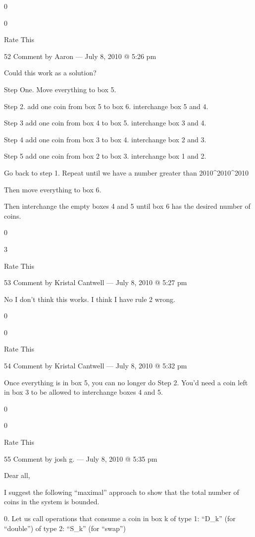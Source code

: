     0
     
    0
     
    Rate This

    52 Comment by Aaron — July 8, 2010 @ 5:26 pm

    Could this work as a solution?

    Step One.
    Move everything to box 5.

    Step 2.
    add one coin from box 5 to box 6.
    interchange box 5 and 4.

    Step 3
    add one coin from box 4 to box 5.
    interchange box 3 and 4.

    Step 4
    add one coin from box 3 to box 4.
    interchange box 2 and 3.

    Step 5
    add one coin from box 2 to box 3.
    interchange box 1 and 2.

    Go back to step 1. Repeat until we have a number greater than 2010^{2010^{2010}}

    Then move everything to box 6.

    Then interchange the empty boxes 4 and 5 until box 6
    has the desired number of coins.
     
    0
     
    3
     
    Rate This

    53 Comment by Kristal Cantwell — July 8, 2010 @ 5:27 pm

        No I don’t think this works. I think I have rule 2 wrong.
         
        0
         
        0
         
        Rate This

        54 Comment by Kristal Cantwell — July 8, 2010 @ 5:32 pm

        Once everything is in box 5, you can no longer do Step 2. You’d need a coin left in box 3 to be allowed to interchange boxes 4 and 5.
         
        0
         
        0
         
        Rate This

        55 Comment by josh g. — July 8, 2010 @ 5:35 pm

    Dear all,

    I suggest the following “maximal” approach to show that the total number of coins in the system is bounded.

    0. Let us call operations that consume a coin in box k
    of type 1: “D_k” (for “double”)
    of type 2: “S_k” (for “swap”)

